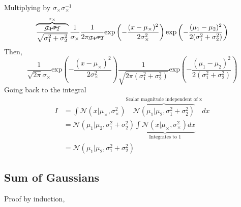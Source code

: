 \documentclass[article]{jss}
\newcommand{\N}{\mathcal{N}}
\begin{document}
%
Multiplying by $\sigma_{\times}\sigma_{\times}^{-1}$
\begin{equation}
\overbrace{\frac{\cancel{\sigma_1\sigma_2}}{\sqrt{\sigma_1^2+\sigma_2^2}}}^{\sigma_{\times}} \frac{1}{\sigma_{\times}} \frac{1}{2\pi\cancel{\sigma_1\sigma_2}}\text{exp}\left(  - \frac{(x-\mu_{\times})^2}{2\sigma_{\times}^2} \right) \text{exp} \left( - \frac{(\mu_1 - \mu_2)^2}{2(\sigma_1^2 + \sigma_2^2)} \right)
\end{equation}
%
Then,
\begin{equation}
 \frac{1}{\sqrt{2\pi}\sigma_{\times}}\text{exp}\left(  - \frac{(x-\mu_{\times})^2}{2\sigma_{\times}^2} \right) \frac{1}{\sqrt{2\pi(\sigma_1^2+\sigma_2^2)}} \text{exp} \left( - \frac{(\mu_1 - \mu_2)^2}{2(\sigma_1^2 + \sigma_2^2)} \right)
\end{equation}
%
Going back to the integral
\begin{equation}
\begin{split}
I & = \int \N(x|\mu_{\times},\sigma_{\times}^2) \overbrace{\N(\mu_1|\mu_2,\sigma_1^2 + \sigma_2^2)}^{\text{Scalar magnitude independent of x}} dx \\[0.3cm]
& = \N(\mu_1|\mu_2,\sigma_1^2 + \sigma_2^2) \underbrace{\int \N(x|\mu_{\times},\sigma_{\times}^2)  dx}_{\text{Integrates to 1}} \\
& = \N(\mu_1|\mu_2,\sigma_1^2 + \sigma_2^2)
\end{split}
\end{equation}

\subsection{Sum of Gaussians}\label{suma_normales_induccion}

Proof by induction,
\end{document}
